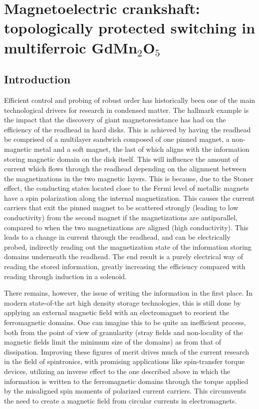 \newcommand{\Jpar}{J_{||}}
\newcommand{\Jperp}{J_{\perp}}
\chapter{Magnetoelectric crankshaft: topologically protected switching in multiferroic GdMn$_2$O$_5$}
\section{Introduction}
Efficient control and probing of robust order has historically been one of the main technological drivers for research in condensed matter.
The hallmark example is the impact that the discovery of giant magnetoresistance has had on the efficiency of the readhead in hard disks.
This is achieved by having the readhead be comprised of a multilayer sandwich composed of one pinned magnet, a non-magnetic metal and a soft magnet, the last of which aligns with the information storing magnetic domain on the disk itself.
This will influence the amount of current which flows through the readhead depending on the alignment between the magnetizations in the two magnetic layers. This is because, due to the Stoner effect, the conducting states located close to the Fermi level of metallic magnets have a spin polarization along the internal magnetization. This causes the current carriers that exit the pinned magnet to be scattered strongly (leading to low conductivity) from the second magnet if the magnetizations are antiparallel, compared to when the two magnetizations are aligned (high conductivity).
This leads to a change in current through the readhead, and can be electrically probed, indirectly reading out the magnetization state of the information storing domains underneath the readhead.
The end result is a purely electrical way of reading the stored information, greatly increasing the efficiency compared with reading through induction in a solenoid.

There remains, however, the issue of writing the information in the first place.
In modern state-of-the art high density storage technologies, this is still done by applying an external magnetic field with an electromagnet to reorient the ferromagnetic domains. One can imagine this to be quite an inefficient process, both from the point of view of granularity (stray fields and non-locality of the magnetic fields limit the minimum size of the domains) as from that of dissipation.
Improving these figures of merit drives much of the current research in the field of spintronics, with promising applications like spin-transfer torque devices, utilizing an inverse effect to the one described above in which the information is written to the ferromagnetic domains through the torque applied by the misaligned spin moments of polarized current carriers. This circumvents the need to create a magnetic field from circular currents in electromagnets.

